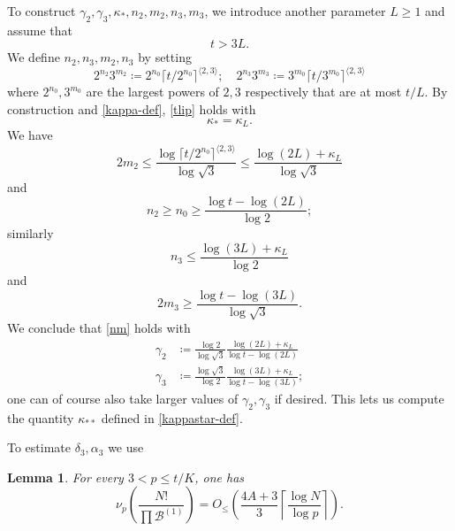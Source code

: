 \documentclass[12pt,a4paper,reqno]{amsart}
\numberwithin{equation}{section}
\theoremstyle{plain}
\newtheorem{lemma}[theorem]{Lemma}
\theoremstyle{definition}
\newcommand\tuple{{\mathcal B}}
\begin{document}
To construct $\gamma_2, \gamma_3, \kappa_*, n_2, m_2, n_3, m_3$, we introduce another parameter $L \geq 1$ and assume that
\begin{equation}\label{t-lower}
  t > 3L.
\end{equation}
We define $n_2,n_3,m_2,n_3$ by setting
$$
2^{n_2} 3^{m_2} \coloneqq 2^{n_0} \lceil t/2^{n_0} \rceil^{\langle 2,3 \rangle}; \quad 
2^{n_3} 3^{m_3} \coloneqq 3^{m_0} \lceil t/3^{m_0} \rceil^{\langle 2,3 \rangle}$$
where $2^{n_0}, 3^{m_0}$ are the largest powers of $2,3$ respectively that are at most $t/L$.  By construction and \eqref{kappa-def}, \eqref{tlip} holds with
\begin{equation}\label{kappas-eq}
  \kappa_* = \kappa_L.
\end{equation}
We have
$$  2m_2 \leq \frac{\log \lceil t/2^{n_0} \rceil^{\langle 2,3 \rangle}}{\log \sqrt{3}}  \leq \frac{\log(2L) + \kappa_L}{\log \sqrt{3}}  
$$
and
$$n_2 \geq n_0 \geq \frac{\log t - \log(2L)}{\log 2};$$
similarly
$$ n_3 \leq \frac{\log(3L)+\kappa_L}{\log 2}$$
and
$$ 2m_3 \geq \frac{\log t - \log(3L)}{\log \sqrt{3}}.$$
We conclude that \eqref{nm} holds with
\begin{equation}\label{gammas-def}
\begin{split}
\gamma_2 &\coloneqq \frac{\log 2}{\log \sqrt{3}} \frac{\log(2L) + \kappa_L}{\log t - \log(2L)} \\
\gamma_3 &\coloneqq \frac{\log \sqrt{3}}{\log 2} \frac{\log(3L) + \kappa_L}{\log t - \log(3L)};
\end{split}
\end{equation}
one can of course also take larger values of $\gamma_2,\gamma_3$ if desired.
This lets us compute the quantity $\kappa_{**}$ defined in \eqref{kappastar-def}.

To estimate $\delta_3, \alpha_3$ we use

\begin{lemma}\label{val-bound} For every $3 < p \leq t/K$, one has
\begin{equation}\label{nup} 
  \nu_p\left(\frac{N!}{\prod \tuple^{(1)}}\right) =  
O_{\leq}\left(\frac{4A+3}{3} \left\lceil \frac{\log N}{\log p}  \right\rceil\right).
\end{equation}
\end{lemma}
\end{document}
